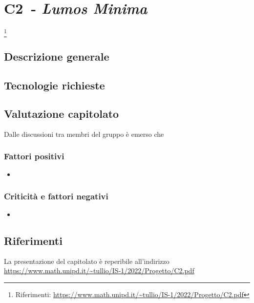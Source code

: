 
\renewcommand{\capName}{\textit{Lumos Minima}} %
\renewcommand{\capCode}{C2} %
\renewcommand{\capLink}{https://www.math.unipd.it/~tullio/IS-1/2022/Progetto/C2.pdf} %
\renewcommand{\capProposer}{ImolaInformatica} %


\section{\capCode\ - \capName} \footnote{Riferimenti: \url{\capLink}}
\subsection{Descrizione generale}

\subsection{Tecnologie richieste}

\subsection{Valutazione capitolato}
Dalle discussioni tra membri del gruppo è emerso che

\subsubsection{Fattori positivi}

\begin{itemize}
    \item 
\end{itemize}

\subsubsection{Criticità e fattori negativi}

\begin{itemize}
    \item 
\end{itemize}

\subsection{Riferimenti}
La presentazione del capitolato è reperibile all'indirizzo \url{\capLink}